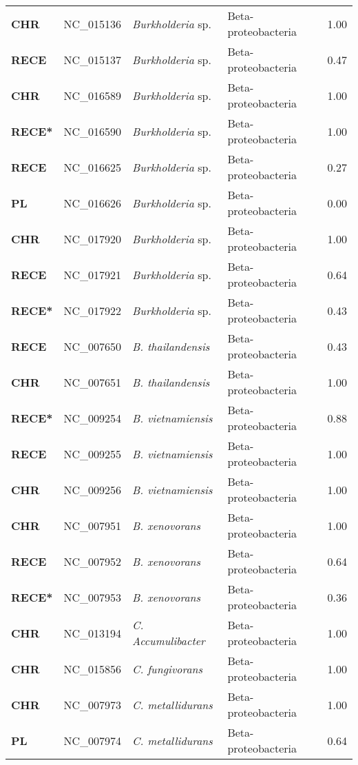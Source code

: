 \begin{adjustwidth}{-3cm}{2cm}
{\begin{supertabular}{>{\bfseries}l|p{0.1\textwidth}p{0.14\textwidth}l|l}
CHR & NC\_015136 & \textit{Burkholderia} sp. & Beta-proteobacteria & 1.00\\
RECE & NC\_015137 & \textit{Burkholderia} sp. & Beta-proteobacteria & 0.47\\
CHR & NC\_016589 & \textit{Burkholderia} sp. & Beta-proteobacteria & 1.00\\
RECE* & NC\_016590 & \textit{Burkholderia} sp. & Beta-proteobacteria & 1.00\\
RECE & NC\_016625 & \textit{Burkholderia} sp. & Beta-proteobacteria & 0.27\\
PL & NC\_016626 & \textit{Burkholderia} sp. & Beta-proteobacteria & 0.00\\
CHR & NC\_017920 & \textit{Burkholderia} sp. & Beta-proteobacteria & 1.00\\
RECE & NC\_017921 & \textit{Burkholderia }sp. & Beta-proteobacteria & 0.64\\
RECE* & NC\_017922 & \textit{Burkholderia} sp. & Beta-proteobacteria & 0.43\\
RECE & NC\_007650 & \textit{B. thailandensis} & Beta-proteobacteria & 0.43\\
CHR & NC\_007651 & \textit{B. thailandensis} & Beta-proteobacteria & 1.00\\
RECE* & NC\_009254 & \textit{B. vietnamiensis} & Beta-proteobacteria & 0.88\\
RECE & NC\_009255 & \textit{B. vietnamiensis} & Beta-proteobacteria & 1.00\\
CHR & NC\_009256 & \textit{B. vietnamiensis} & Beta-proteobacteria & 1.00\\
CHR & NC\_007951 & \textit{B. xenovorans} & Beta-proteobacteria & 1.00\\
RECE & NC\_007952 & \textit{B. xenovorans} & Beta-proteobacteria & 0.64\\
RECE* & NC\_007953 & \textit{B. xenovorans} & Beta-proteobacteria & 0.36\\
CHR & NC\_013194 & \textit{C. Accumulibacter} & Beta-proteobacteria & 1.00\\
CHR & NC\_015856 & \textit{C. fungivorans} & Beta-proteobacteria & 1.00\\
CHR & NC\_007973 & \textit{C. metallidurans} & Beta-proteobacteria & 1.00\\
PL & NC\_007974 & \textit{C. metallidurans} & Beta-proteobacteria & 0.64\\

\end{supertabular}}
\end{adjustwidth}
